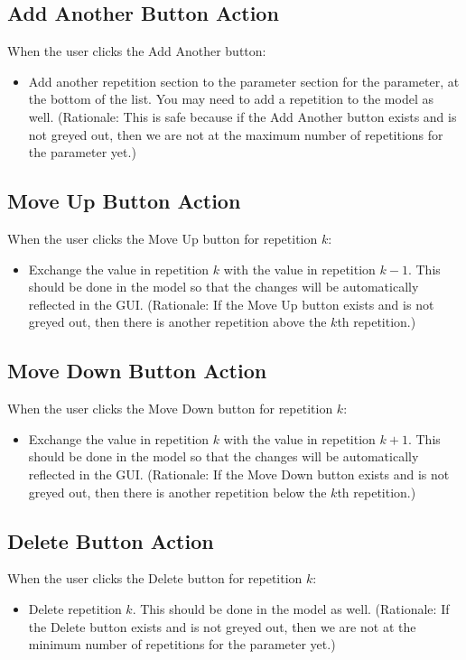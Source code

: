 \documentclass[11pt]{article}
\begin{document}
\subsection{Add Another Button Action}

When the user clicks the Add Another button:
\begin{itemize}
\item Add another repetition section to the parameter section for the
  parameter, at the bottom of the list.  You may need to add a repetition
  to the model as well.
  (Rationale:  This is safe because if the Add Another button exists
  and is not greyed out, then we are not at the maximum number of
  repetitions for the parameter yet.)
\end{itemize}

\subsection{Move Up Button Action}

When the user clicks the Move Up button for repetition $k$:
\begin{itemize}
\item Exchange the value in repetition $k$ with the value in repetition $k-1$.
  This should be done in the model so that the changes will be automatically
  reflected in the GUI.
  (Rationale:  If the Move Up button exists and is not greyed out, then
  there is another repetition above the $k$th repetition.)
\end{itemize}

\subsection{Move Down Button Action}

When the user clicks the Move Down button for repetition $k$:
\begin{itemize}
\item Exchange the value in repetition $k$ with the value in repetition $k+1$.
  This should be done in the model so that the changes will be automatically
  reflected in the GUI.
  (Rationale:  If the Move Down button exists and is not greyed out, then
  there is another repetition below the $k$th repetition.)
\end{itemize}

\subsection{Delete Button Action}

When the user clicks the Delete button for repetition $k$:
\begin{itemize}
\item Delete repetition $k$.  This should be done in the model as well.
  (Rationale:  If the Delete button exists and is not greyed out, then
  we are not at the minimum number of repetitions for the parameter yet.)
\end{itemize}
\end{document}

